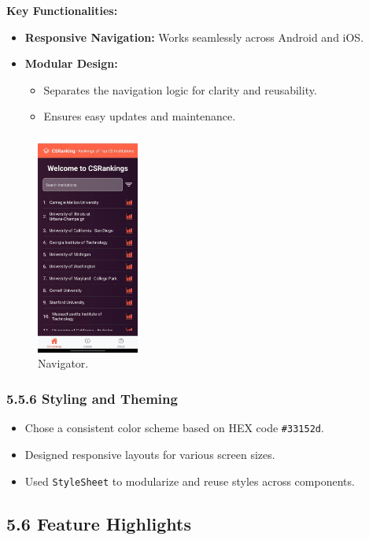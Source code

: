 \documentclass[12pt]{article}
\begin{document}
\textbf{Key Functionalities:}
\begin{itemize}
    \item \textbf{Responsive Navigation:} Works seamlessly across Android and iOS.
    \item \textbf{Modular Design:}
    \begin{itemize}
        \item Separates the navigation logic for clarity and reusability.
        \item Ensures easy updates and maintenance.
    \end{itemize}
\end{itemize}

\begin{figure}[H]
    \centering
    \includegraphics[width=0.3\textwidth, height=0.5\textheight]{home.jpg} %
    \caption{Navigator.}
    \label{fig:example_image}
\end{figure}

\subsubsection*{5.5.6 Styling and Theming}
\begin{itemize}
    \item Chose a consistent color scheme based on HEX code \texttt{\#33152d}.
    \item Designed responsive layouts for various screen sizes.
    \item Used \texttt{StyleSheet} to modularize and reuse styles across components.
\end{itemize}

\clearpage
\subsection*{5.6 Feature Highlights}
\end{document}
